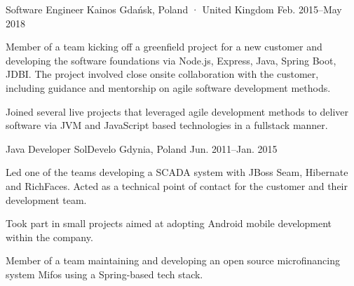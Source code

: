 \begin{cventries}
  \cventry
    {Software Engineer} %
    {Kainos} %
    {Gdańsk, Poland · United Kingdom} %
    {Feb. 2015–May 2018} %
    {
      \begin{cvitems} %
        \item {Member of a team kicking off a greenfield project for a new customer and developing the software foundations via Node.js, Express, Java, Spring Boot, JDBI. The project involved close onsite collaboration with the customer, including guidance and mentorship on agile software development methods.}
        \item {Joined several live projects that leveraged agile development methods to deliver software via JVM and JavaScript based technologies in a fullstack manner.}
      \end{cvitems}
    }

  \cventry
    {Java Developer} %
    {SolDevelo} %
    {Gdynia, Poland} %
    {Jun. 2011–Jan. 2015} %
    {
      \begin{cvitems} %
        \item {Led one of the teams developing a SCADA system with JBoss Seam, Hibernate and RichFaces. Acted as a technical point of contact for the customer and their development team.}
        \item {Took part in small projects aimed at adopting Android mobile development within the company.}
        \item {Member of a team maintaining and developing an open source microfinancing system Mifos using a Spring-based tech stack.}
      \end{cvitems}
    }

\end{cventries}
